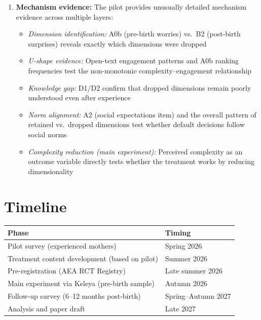 \documentclass[12pt,a4paper]{article}
\begin{document}
\begin{enumerate}
    \item \textbf{Mechanism evidence:} The pilot provides unusually detailed mechanism evidence across multiple layers:
    \begin{itemize}[nosep]
        \item \emph{Dimension identification:} A0b (pre-birth worries) vs.\ B2 (post-birth surprises) reveals exactly which dimensions were dropped
        \item \emph{U-shape evidence:} Open-text engagement patterns and A0b ranking frequencies test the non-monotonic complexity--engagement relationship
        \item \emph{Knowledge gap:} D1/D2 confirm that dropped dimensions remain poorly understood even after experience
        \item \emph{Norm alignment:} A2 (social expectations item) and the overall pattern of retained vs.\ dropped dimensions test whether default decisions follow social norms
        \item \emph{Complexity reduction (main experiment):} Perceived complexity as an outcome variable directly tests whether the treatment works by reducing dimensionality
    \end{itemize}
\end{enumerate}

\section{Timeline}

\begin{table}[h]
\centering
\begin{tabular}{@{}ll@{}}
\toprule
\textbf{Phase} & \textbf{Timing} \\
\midrule
Pilot survey (experienced mothers) & Spring 2026 \\
Treatment content development (based on pilot) & Summer 2026 \\
Pre-registration (AEA RCT Registry) & Late summer 2026 \\
Main experiment via Keleya (pre-birth sample) & Autumn 2026 \\
Follow-up survey (6--12 months post-birth) & Spring--Autumn 2027 \\
Analysis and paper draft & Late 2027 \\
\bottomrule
\end{tabular}
\end{table}
\end{document}
